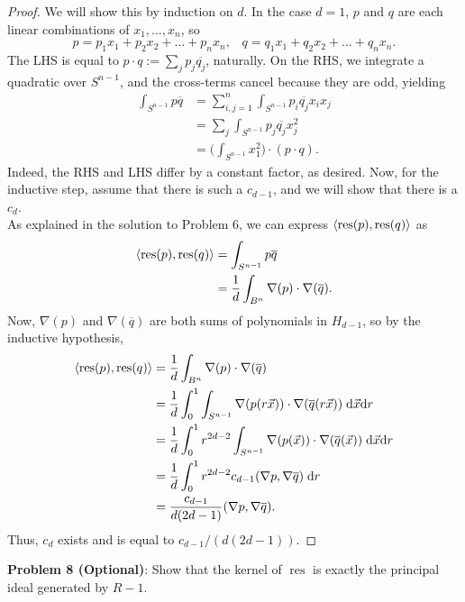 \documentclass{amsart}
\DeclareMathOperator{\res}{res}
\begin{document}
 \begin{proof}
 	We will show this by induction on $d$. In the case $d=1$, $p$ and $q$ are each linear combinations of $x_1,\dots,x_n$, so 
 	$$
 	p = p_1x_1 + p_2x_2+\dots +p_n x_n, \;\;\; 	q = q_1x_1 + q_2x_2+\dots +q_n x_n.
 	$$
 	The LHS is equal to $p\cdot q:= \sum_j p_j\overline{q_j}$, naturally. On the RHS, we integrate a quadratic over $S^{n-1}$, and the cross-terms cancel because they are odd, yielding
 	\begin{align*}
 		\int_{S^{n-1}} p\overline{q} &= \sum_{i,j=1}^n \int_{S^{n-1}} p_i\overline{q_j} x_ix_j\\
 		&= \sum_j \int_{S^{n-1}} p_j\overline{q_j} x_j^2\\
 		&= \bigg(\int_{S^{n-1}} x_1^2 \bigg) \cdot (p \cdot q).
 	\end{align*}
 	Indeed, the RHS and LHS differ by a constant factor, as desired. Now, for the inductive step, assume that there is such a $c_{d-1}$, and we will show that there is a $c_d$.\\
 	
 	As explained in the solution to Problem 6, we can express $\<\res(p),\res(q)\>$ as 
 	\begin{align*}
 		\<\res(p),\res(q)\> &= \int_{S^{n-1}} p\overline{q} \\
 		&= \frac{1}{d}\int_{B^n} \nabla(p) \cdot \nabla(\overline{q}).
 	\end{align*}
 	Now, $\nabla(p)$ and $\nabla(\overline{q})$ are both sums of polynomials in $H_{d-1}$, so by the inductive hypothesis,
 	\begin{align*}
 		\<\res(p),\res(q)\> &= \frac{1}{d}\int_{B^n} \nabla(p) \cdot \nabla(\overline{q})\\
 		&= \frac{1}{d} \int_{0}^1 \int_{S^{n-1}} \nabla(p(r\vec{x})) \cdot \nabla(\overline{q}(r\vec{x})) \;\d \vec{x} \d r\\
 		&= \frac{1}{d} \int_{0}^1 r^{2d-2} \int_{S^{n-1}} \nabla(p(\vec{x})) \cdot \nabla(\overline{q}(\vec{x})) \;\d \vec{x} \d r\\
 		&= \frac{1}{d} \int_{0}^1 r^{2d-2} c_{d-1} (\nabla p,\nabla\overline{q})\;\d r\\
 		&= \frac{c_{d-1}}{d(2d-1)} (\nabla p, \nabla \overline{q}).
 	\end{align*}
 	Thus, $c_d$ exists and is equal to $c_{d-1}/(d(2d-1))$.
 \end{proof}
 
 \newpage
 
\noindent \textbf{Problem 8 (Optional)}: Show that the kernel of $\res$ is exactly the principal ideal generated by $R-1$.
\end{document}
